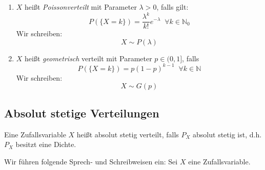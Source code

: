 \begin{enumerate}
    \item $X$ heißt \emph{Poissonverteilt} mit Parameter $\lambda > 0$, falls gilt:
          \begin{equation*}
              P(\{X=k\}) = \frac{\lambda^k}{k!} e^{-\lambda} \;\; \forall k\in \mathbb{N}_0
          \end{equation*}
          Wir schreiben:
          \begin{equation*}
              X \sim P(\lambda)
          \end{equation*}

    \item $X$ heißt \emph{geometrisch} verteilt mit Parameter $p \in (0,1]$, falls
          \begin{equation*}
              P(\{X=k\}) = p (1-p)^{k-1} \;\; \forall k \in \mathbb{N}
          \end{equation*}
          Wir schreiben:
          \begin{equation*}
              X \sim G(p)
          \end{equation*}
\end{enumerate}

\subsection{Absolut stetige Verteilungen}
\begin{definition}
    Eine Zufallsvariable $X$ heißt absolut stetig verteilt, falls $P_X$ absolut stetig ist,
    d.h. $P_X$ besitzt eine Dichte.
\end{definition}

Wir führen folgende Sprech- und Schreibweisen ein: Sei $X$ eine Zufallsvariable.

